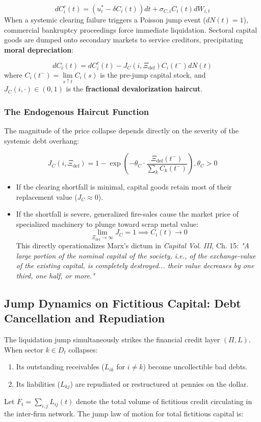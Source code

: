 \documentclass[11pt,letterpaper]{report}
\begin{document}
\[
d{C}_{i}^{c}(t)=\left({{u}_{i}^{*}-\delta {C}_{i}(t)}\right)dt+{\sigma }_{C,i}{C}_{i}(t)d{W}_{i,t}
\]
When a systemic clearing failure triggers a Poisson jump event ($dN(t)=1$), commercial bankruptcy proceedings force immediate liquidation. Sectoral capital goods are dumped onto secondary markets to service creditors, precipitating \textbf{moral depreciation}:

\[
d{C}_{i}(t)=d{C}_{i}^{c}(t)-{J}_{C}(i,{\Xi }_{\mathrm{def}}){C}_{i}({t}^{-})dN(t)
\]
where ${C}_{i}({t}^{-})=\lim\limits_{s\uparrow t}{C}_{i}(s)$ is the pre-jump capital stock, and ${J}_{C}(i,\cdot )\in (0,1)$ is the \textbf{fractional devalorization haircut}.

\subsubsection{The Endogenous Haircut Function}
The magnitude of the price collapse depends directly on the severity of the systemic debt overhang:

\[
{J}_{C}(i,{\Xi }_{\mathrm{def}})=1-\exp \left({-{\theta }_{C}\cdot \frac{{\Xi }_{\mathrm{def}}({t}^{-})}{\sum_{k}{C}_{k}({t}^{-})}}\right),{\theta }_{C}>0
\]
\begin{itemize}
\item If the clearing shortfall is minimal, capital goods retain most of their replacement value (${J}_{C}\approx 0$).
\item If the shortfall is severe, generalized fire-sales cause the market price of specialized machinery to plunge toward scrap metal value:
\[\lim_{\Xi_{\text{def}} \to \infty} J_C = 1 \implies C_i(t) \to 0\]
This directly operationalizes Marx's dictum in \emph{Capital Vol. III}, Ch. 15:
\emph{"A large portion of the nominal capital of the society, i.e., of the exchange-value of the existing capital, is completely destroyed... their value decreases by one third, one half, or more."}
\end{itemize}
\subsection{Jump Dynamics on Fictitious Capital: Debt Cancellation and Repudiation}
The liquidation jump simultaneously strikes the financial credit layer $(\Pi ,L)$. When sector $k\in {D}_{t}$ collapses:

\begin{enumerate}
\item Its outstanding receivables (${L}_{ik}$ for $i\ne k$) become uncollectible bad debts.
\item Its liabilities (${L}_{kj}$) are repudiated or restructured at pennies on the dollar.
\end{enumerate}
Let ${F}_{t}=\sum_{i,j}{L}_{ij}(t)$ denote the total volume of fictitious credit circulating in the inter-firm network. The jump law of motion for total fictitious capital is:
\end{document}
